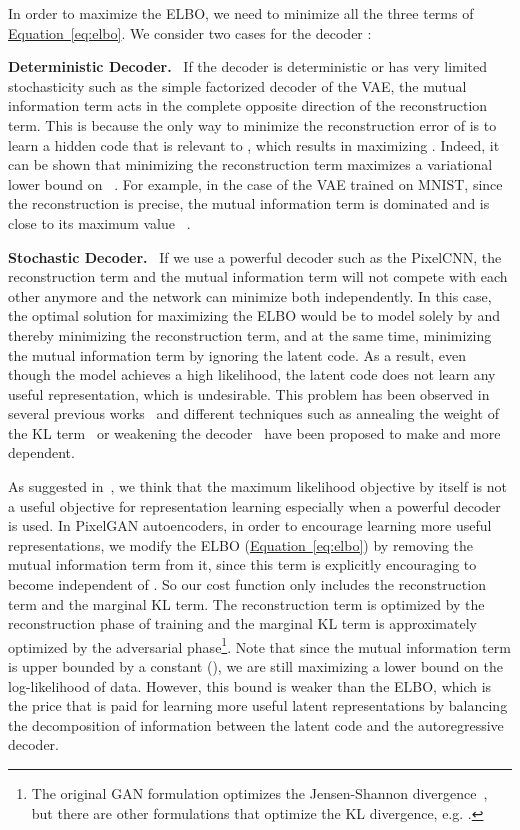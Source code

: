 \documentclass{article}
\newcommand{\myeq}[1]{\hyperref[eq:#1]{Equation~\ref*{eq:#1}}}
\DeclareRobustCommand{\parhead}[1]{\textbf{#1}~}
\begin{document}
In order to maximize the ELBO, we need to minimize all the three terms of \myeq{elbo}.
We consider two cases for the decoder :

\parhead{Deterministic Decoder.} If the decoder  is deterministic or has very limited stochasticity such as the simple factorized decoder of the VAE, the mutual information term acts in the complete opposite direction of the reconstruction term. This is because the only way to minimize the reconstruction error of  is to learn a hidden code  that is relevant to , which results in maximizing . Indeed, it can be shown that minimizing the reconstruction term maximizes a variational lower bound on ~\citep{im,infogan}. For example, in the case of the VAE trained on MNIST, since the reconstruction is precise, the mutual information term is dominated and is close to its maximum value ~\citep{surgery}. 

\parhead{Stochastic Decoder.} If we use a powerful decoder such as the PixelCNN, the reconstruction term and the mutual information term will not compete with each other anymore and the network can minimize both independently. In this case, the optimal solution for maximizing the ELBO would be to model  solely by  and thereby minimizing the reconstruction term, and at the same time, minimizing the mutual information term by ignoring the latent code. As a result, even though the model achieves a high likelihood, the latent code does not learn any useful representation, which is undesirable. This problem has been observed in several previous works~\citep{bowman,vlae} and different techniques such as annealing the weight of the KL term~\citep{bowman} or weakening the decoder~\citep{vlae} have been proposed to make  and  more dependent. 



As suggested in~\citep{ference_ml,vlae}, we think that the maximum likelihood objective by itself is not a useful objective for representation learning especially when a powerful decoder is used. 
In PixelGAN autoencoders, in order to encourage learning more useful representations, we modify the ELBO (\myeq{elbo}) by removing the mutual information term from it, since this term is explicitly encouraging  to become independent of . So our cost function only includes the reconstruction term and the marginal KL term. The reconstruction term is optimized by the reconstruction phase of training and the marginal KL term is approximately optimized by the adversarial phase\footnote{The original GAN formulation optimizes the Jensen-Shannon divergence~\citep{gan}, but there are other formulations that optimize the KL divergence, e.g. \citep{ference}.}.
Note that since the mutual information term is upper bounded by a constant (), we are still maximizing a lower bound on the log-likelihood of data. However, this bound is weaker than the ELBO, which is the price that is paid for learning more useful latent representations by balancing the decomposition of information between the latent code and the autoregressive decoder.
\end{document}
